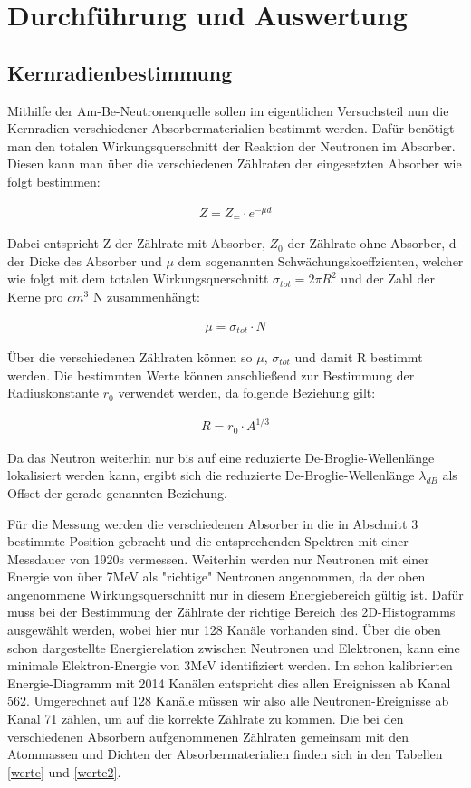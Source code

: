 \section{Durchführung und Auswertung}

\subsection{Kernradienbestimmung}

Mithilfe der Am-Be-Neutronenquelle sollen im eigentlichen Versuchsteil nun die Kernradien verschiedener Absorbermaterialien bestimmt werden. 
Dafür benötigt man den totalen Wirkungsquerschnitt der Reaktion der Neutronen im Absorber. Diesen kann man über die verschiedenen Zählraten der eingesetzten Absorber wie folgt bestimmen:

\begin{align}
Z=Z_=\cdot e^{-\mu d}
\end{align}

Dabei entspricht Z der Zählrate mit Absorber, $Z_0$ der Zählrate ohne Absorber, d der Dicke des Absorber und $\mu$ dem sogenannten Schwächungskoeffzienten, welcher wie folgt mit dem totalen Wirkungsquerschnitt $\sigma_{tot} = 2\pi R^2$ und der Zahl der Kerne pro $cm^3$ N zusammenhängt:

\begin{align}
\mu=\sigma_{tot}\cdot N 
\end{align}

Über die verschiedenen Zählraten können so $\mu$, $\sigma_{tot}$ und damit R bestimmt werden. Die bestimmten Werte können anschließend zur Bestimmung der Radiuskonstante $r_0$ verwendet werden, da folgende Beziehung gilt:

\begin{align}
R=r_0 \cdot A^{1/3}
\end{align}

Da das Neutron weiterhin nur bis auf eine reduzierte De-Broglie-Wellenlänge lokalisiert werden kann, ergibt sich die reduzierte De-Broglie-Wellenlänge $\lambda_{dB}$ als Offset der gerade genannten Beziehung.

Für die Messung werden die verschiedenen Absorber in die in Abschnitt 3 bestimmte Position gebracht und die entsprechenden Spektren mit einer Messdauer von 1920s vermessen. Weiterhin werden nur Neutronen mit einer Energie von über 7MeV als "richtige" Neutronen angenommen, da der oben angenommene Wirkungsquerschnitt nur in diesem Energiebereich gültig ist. Dafür muss bei der Bestimmung der Zählrate der richtige Bereich des 2D-Histogramms ausgewählt werden, wobei hier nur 128 Kanäle vorhanden sind. Über die oben schon dargestellte Energierelation zwischen Neutronen und Elektronen, kann eine minimale Elektron-Energie von 3MeV identifiziert werden. Im schon kalibrierten Energie-Diagramm mit 2014 Kanälen entspricht dies allen Ereignissen ab Kanal 562. Umgerechnet auf 128 Kanäle müssen wir also alle Neutronen-Ereignisse ab Kanal 71 zählen, um auf die korrekte Zählrate zu kommen. Die bei den verschiedenen Absorbern aufgenommenen Zählraten gemeinsam mit den Atommassen und Dichten der Absorbermaterialien finden sich in den Tabellen \ref{werte} und \ref{werte2}. 

